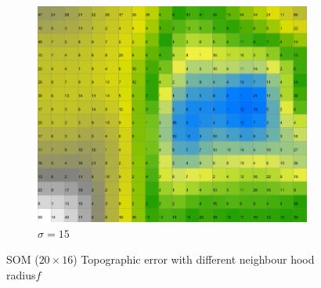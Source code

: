 \documentclass{acm_proc_article-sp}
\begin{document}
\begin{figure}
\begin{subfigure}[b]{0.30\linewidth}
        \includegraphics[width=\linewidth]{img/wine-newmid-activity-histogram-sigma-15}
        \caption{$\sigma=15$}
    \end{subfigure}
    \caption{SOM ($20\times16$) Topographic error with different neighbour hood radius$f$}
    \label{fig:wine-newmid-activity-histogram-sigma}
\end{figure}
\end{document}

